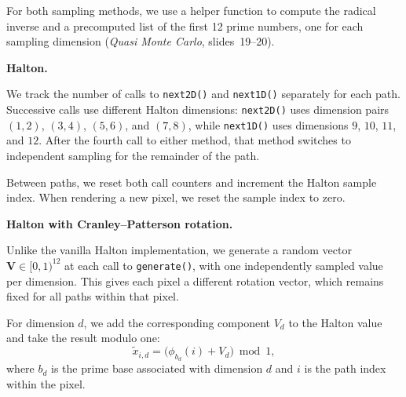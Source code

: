 For both sampling methods, we use a helper function to compute the
radical inverse and a precomputed list of the first 12 prime numbers,
one for each sampling dimension
(\emph{Quasi Monte Carlo}, slides~19--20).



\textbf{Halton.}

We track the number of calls to \texttt{next2D()} and
\texttt{next1D()} separately for each path. Successive calls use
different Halton dimensions: \texttt{next2D()} uses dimension pairs
$(1,2)$, $(3,4)$, $(5,6)$, and $(7,8)$, while \texttt{next1D()}
uses dimensions $9$, $10$, $11$, and $12$. After the fourth call
to either method, that method switches to independent sampling
for the remainder of the path.

Between paths, we reset both call counters and increment the
Halton sample index. When rendering a new pixel, we reset the
sample index to zero.



\textbf{Halton with Cranley--Patterson rotation.}

Unlike the vanilla Halton implementation, we generate a random
vector $\mathbf{V}\in[0,1)^{12}$ at each call to \texttt{generate()},
with one independently sampled value per dimension. This gives
each pixel a different rotation vector, which remains fixed
for all paths within that pixel.

For dimension $d$, we add the corresponding component $V_d$
to the Halton value and take the result modulo one:
\[
\widetilde{x}_{i,d}
= \bigl(\phi_{b_d}(i) + V_d\bigr) \bmod 1,
\]
where $b_d$ is the prime base associated with dimension $d$ and
$i$ is the path index within the pixel.



